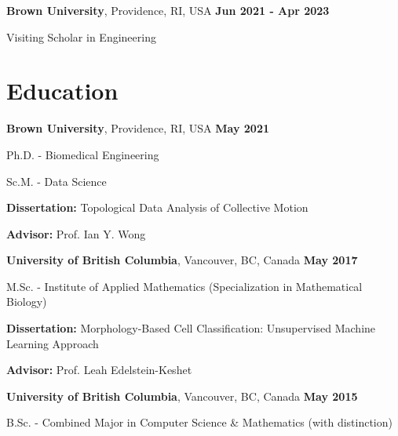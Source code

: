 \documentclass[margin,line]{res}
\newenvironment{list1}{
  \begin{list}{\ding{113}}{
      \setlength{\itemsep}{0in}
      \setlength{\parsep}{0in} \setlength{\parskip}{0in}
      \setlength{\topsep}{0in} \setlength{\partopsep}{0in}
      \setlength{\leftmargin}{0.17in}}}{\end{list}}
\begin{document}
\begin{resume}
{\bf Brown University}, Providence, RI, USA  \hfill {\bf Jun 2021 - Apr 2023}\\
\vspace*{-.2cm}
\begin{list1}
\item[] Visiting Scholar in Engineering
\end{list1}

\vspace*{.08cm}

\section{\sc Education}

{\bf Brown University}, Providence, RI, USA  \hfill {\bf May 2021}\\
\vspace*{-.2cm}
\begin{list1}
\setlength\itemsep{0.15em}
\item[] Ph.D. - Biomedical Engineering
\item[] Sc.M. - Data Science
\vspace*{.1cm}
\item[] {\bf Dissertation:} Topological Data Analysis of Collective Motion
\vspace*{.1cm}
\item[] {\bf Advisor:} Prof. Ian Y. Wong
\end{list1}
\vspace*{.12cm}

{\bf University of British Columbia}, Vancouver, BC, Canada  \hfill {\bf May 2017}\\
\vspace*{-.2cm}
\begin{list1}
\item[] M.Sc. - Institute of Applied Mathematics (Specialization in Mathematical Biology)
\vspace*{.1cm}
\item[] {\bf Dissertation:} Morphology-Based Cell Classification: Unsupervised Machine Learning Approach
\vspace*{-0.3cm}
\item[] {\bf Advisor:} Prof. Leah Edelstein-Keshet
\end{list1}
\vspace*{.12cm}

{\bf University of British Columbia}, Vancouver, BC, Canada  \hfill {\bf May 2015}\\
\vspace*{-.2cm}
\begin{list1}
\item[] B.Sc. - Combined Major in Computer Science \& Mathematics (with distinction)
\end{list1}


\end{resume}
\end{document}
